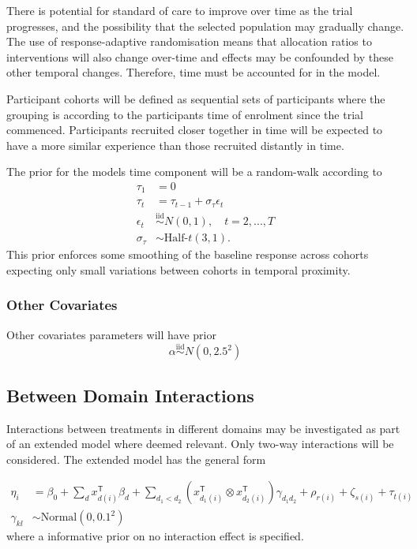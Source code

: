 \documentclass[
  11pt,
]{article}
\begin{document}
There is potential for standard of care to improve over time as the trial progresses, and the possibility that the selected population may gradually change.
The use of response-adaptive randomisation means that allocation ratios to interventions will also change over-time and effects may be confounded by these other temporal changes.
Therefore, time must be accounted for in the model.

Participant cohorts will be defined as sequential sets of participants where the grouping is according to the participants time of enrolment since the trial commenced.
Participants recruited closer together in time will be expected to have a more similar experience than those recruited distantly in time.

The prior for the models time component will be a random-walk according to
\[
\begin{aligned}
\tau_1 &= 0 \\
\tau_t &= \tau_{t-1} + \sigma_\tau\epsilon_t \\
\epsilon_t &\overset{\text{iid}}{\sim} N(0, 1),\quad t=2,...,T \\
\sigma_\tau &\sim \text{Half-}t(3, 1).
\end{aligned}
\]
This prior enforces some smoothing of the baseline response across cohorts expecting only small variations between cohorts in temporal proximity.

\hypertarget{other-covariates}{%
\subsubsection{Other Covariates}\label{other-covariates}}

Other covariates parameters will have prior
\[
\alpha \overset{\text{iid}}{\sim} N(0, 2.5^2)
\]

\hypertarget{between-domain-interactions}{%
\subsection{Between Domain Interactions}\label{between-domain-interactions}}

Interactions between treatments in different domains may be investigated as part of an extended model where deemed relevant.
Only two-way interactions will be considered.
The extended model has the general form

\[
\begin{aligned}
\eta_i &= \beta_0 + \sum_{d} x_{d(i)}^{\mathsf{T}}\beta_d + 
\sum_{d_1<d_2}\left(x_{d_1(i)}^{\mathsf{T}}\otimes x_{d_2(i)}^{\mathsf{T}}\right)\gamma_{d_1d_2} + 
\rho_{r(i)} + \zeta_{s(i)} + \tau_{t(i)} \\
\gamma_{kl} &\sim \text{Normal}(0, 0.1^2)
\end{aligned}
\]
where a informative prior on no interaction effect is specified.
\end{document}
